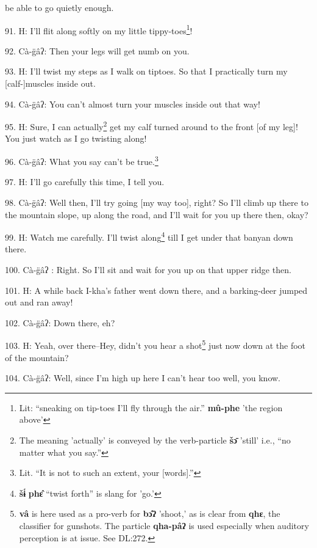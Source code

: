 be able to go quietly enough.

91. H: I'll flit along softly on my little tippy-toes\footnote{Lit: ``sneaking on tip-toes I'll fly through the air.'' \textbf{mû-phe} 'the region above'}!

\begin{center}
\end{center}

92. Cà-g̈âʔ: Then your legs will get numb on you.

93. H: I'll twist my steps as I walk on tiptoes. So that I practically turn my [calf-]muscles
inside out.

94. Cà-g̈âʔ: You can't almost turn your muscles inside out that way!

95. H: Sure, I can actually\footnote{The meaning 'actually' is conveyed by the verb-particle \textbf{šɔ̄} 'still' i.e., ``no matter what you say.''} get my calf turned around to the front [of my leg]!
You just watch as I go twisting along!

\begin{center}
\end{center}

96. Cà-g̈âʔ: What you say can't be true.\footnote{Lit. ``It is not to such an extent, your [words].''}

97. H: I'll go carefully this time, I tell you.

98. Cà-g̈âʔ: Well then, I'll try going [my way too], right? So I'll climb up
there to the mountain slope, up along the road, and I'll wait for you up there
then, okay?

99. H: Watch me carefully. I'll twist along\footnote{\textbf{šɨ́} \textbf{phɛ̂} ``twist forth'' is slang for 'go.'} till I get under that banyan down
there.

100. Cà-g̈âʔ : Right. So I'll sit and wait for you up on that upper ridge then.

101. H: A while back I-kha's father went down there, and a barking-deer jumped out
and ran away!

102. Cà-g̈âʔ: Down there, eh?

103. H: Yeah, over there--Hey, didn't you hear a shot\footnote{\textbf{vâ} is here used as a pro-verb for \textbf{bɔ̂ʔ} 'shoot,' as is clear from \textbf{qhɛ}, the classifier for gunshots. The particle \textbf{qha-pâʔ} is used especially when auditory perception is at issue. See DL:272.} just now down at the
foot of the mountain?

104. Cà-g̈âʔ: Well, since I'm high up here I can't hear too well, you know.

